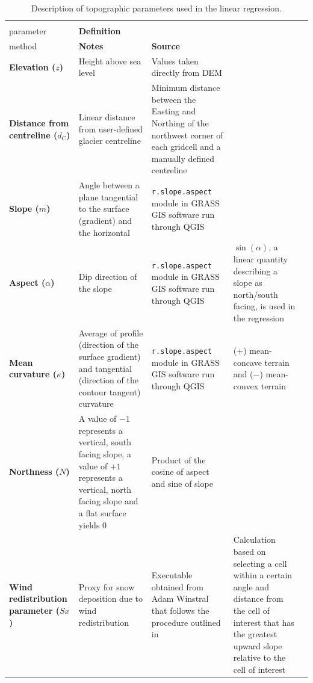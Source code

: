 \documentclass{sfuthesis}
\begin{document}
{%
\begin{landscape}
\begin{table}
\footnotesize
\begin{threeparttable}
\caption{Description of topographic parameters used in the linear regression.}
\label{tab:TopoParams}
\begin{tabularx}{22cm}{XXXXX}
\midrule
\textbf{\begin{tabular}[c]{@{}l@{}}Topographic\\ parameter\end{tabular}} & \textbf{Definition} & \textbf{\begin{tabular}[c]{@{}l@{}}Calculation \\ method\end{tabular}} & \textbf{Notes} & \textbf{Source} \\ \midrule
\textbf{Elevation ($z$)} & Height above sea level & Values taken directly from DEM &  &  \\ \midrule
\textbf{Distance from centreline ($d_C$)} & Linear distance from user-defined glacier centreline & Minimum distance between the Easting and Northing of the northwest corner of each gridcell and a manually defined centreline &  &  \\ \midrule
\textbf{Slope ($m$)} & Angle between a plane tangential to the surface (gradient) and the horizontal & \texttt{r.slope.aspect} module in GRASS GIS software run through QGIS &  & \cite{Mitavsova1993, Hofierka2009, Olaya2009} \\ \midrule
\textbf{Aspect ($\alpha$)} & Dip direction of the slope & \texttt{r.slope.aspect} module in GRASS GIS software run through QGIS & $\sin(\alpha)$, a linear quantity describing a slope as north/south facing, is used in the regression & \cite{Mitavsova1993, Hofierka2009, Olaya2009} \\ \midrule
\textbf{Mean curvature ($\kappa$)} & Average of profile (direction of the surface gradient) and tangential (direction of the contour tangent) curvature & \texttt{r.slope.aspect} module in GRASS GIS software run through QGIS & ($+$) mean-concave terrain and ($-$) mean-convex terrain & \cite{Mitavsova1993, Hofierka2009, Olaya2009} \\ \midrule
\textbf{Northness ($N$)} & A value of $-1$ represents a vertical, south facing slope, a value of $+1$ represents a vertical, north facing slope and a flat surface yields 0 & Product of the cosine of aspect and sine of slope &  & \citep{Molotch2005} \\ \midrule
\textbf{Wind redistribution parameter ($Sx$)} & Proxy for snow deposition due to wind redistribution & Executable obtained from Adam Winstral that follows the procedure outlined in \cite{Winstral2002} & Calculation based on selecting a cell within a certain angle and distance from the cell of interest that has the greatest upward slope relative to the cell of interest & \citep{Winstral2002}
\end{tabularx}
\end{threeparttable}
\end{table}
\end{landscape}


}
\end{document}
